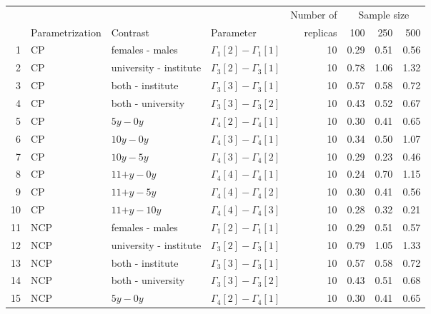 %
\begin{table}[H]
	\centering
	\begin{tabular}{rlllrrrr}		
		\hline
		\multicolumn{4}{c}{ } & Number of &\multicolumn{3}{c}{ Sample size } \\ 
		\cmidrule(rl){6-8}
		& Parametrization & Contrast & Parameter & replicas & 100 & 250 & 500 \\ 
		\hline\hline
		1 & CP & \footnotesize{females - males} & $\Gamma_{1}[2] - \Gamma_{1}[1]$ & 10 & 0.29 & 0.51 & 0.56 \\ 
		2 & CP & \footnotesize{university -  institute} & $\Gamma_{3}[2] - \Gamma_{3}[1]$ & 10 & 0.78 & 1.06 & 1.32 \\ 
		3 & CP & \footnotesize{both -  institute} & $\Gamma_{3}[3] - \Gamma_{3}[1]$ & 10 & 0.57 & 0.58 & 0.72 \\ 
		4 & CP & \footnotesize{both - university} & $\Gamma_{3}[3] - \Gamma_{3}[2]$ & 10 & 0.43 & 0.52 & 0.67 \\
		5 & CP & \footnotesize{$5y - 0y$} & $\Gamma_{4}[2] - \Gamma_{4}[1]$ & 10 & 0.30 & 0.41 & 0.65 \\ 
		6 & CP & \footnotesize{$10y - 0y$} & $\Gamma_{4}[3] - \Gamma_{4}[1]$ & 10 & 0.34 & 0.50 & 1.07 \\
		7 & CP & \footnotesize{$10y - 5y$} & $\Gamma_{4}[3] - \Gamma_{4}[2]$ & 10 & 0.29 & 0.23 & 0.46 \\
		8 & CP & \footnotesize{$11\text{+}y - 0y$} & $\Gamma_{4}[4] - \Gamma_{4}[1]$ & 10 & 0.24 & 0.70 & 1.15 \\ 
		9 & CP & \footnotesize{$11\text{+}y - 5y$} & $\Gamma_{4}[4] - \Gamma_{4}[2]$ & 10 & 0.30 & 0.41 & 0.56 \\  
		10 & CP & \footnotesize{$11\text{+}y - 10y$} & $\Gamma_{4}[4] - \Gamma_{4}[3]$ & 10 & 0.28 & 0.32 & 0.21 \\
		\hline
		11 & NCP & \footnotesize{females - males} & $\Gamma_{1}[2] - \Gamma_{1}[1]$ & 10 & 0.29 & 0.51 & 0.57 \\ 
		12 & NCP & \footnotesize{university -  institute} & $\Gamma_{3}[2] - \Gamma_{3}[1]$ & 10 & 0.79 & 1.05 & 1.33 \\
		13 & NCP & \footnotesize{both -  institute} & $\Gamma_{3}[3] - \Gamma_{3}[1]$ & 10 & 0.57 & 0.58 & 0.72 \\ 
		14 & NCP & \footnotesize{both - university} & $\Gamma_{3}[3] - \Gamma_{3}[2]$ & 10 & 0.43 & 0.51 & 0.68 \\
		15 & NCP & \footnotesize{$5y - 0y$} & $\Gamma_{4}[2] - \Gamma_{4}[1]$ & 10 & 0.30 & 0.41 & 0.65 \\

\end{tabular}
\end{table}
